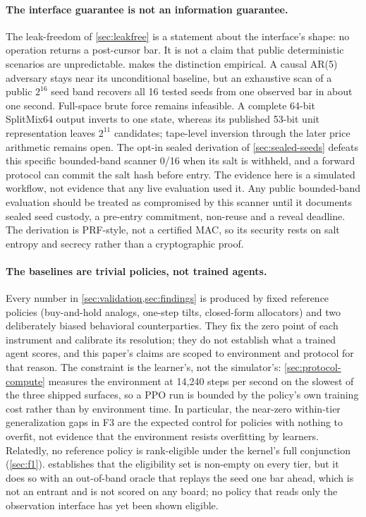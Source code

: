 \paragraph{The interface guarantee is not an information guarantee.} The leak-freedom of \cref{sec:leakfree} is a statement about the interface's shape: no operation returns a post-cursor bar. It is not a claim that public deterministic scenarios are unpredictable.  makes the distinction empirical. A causal AR(5) adversary stays near its unconditional baseline, but an exhaustive scan of a public $2^{16}$ seed band recovers all 16 tested seeds from one observed bar in about one second. Full-space brute force remains infeasible. A complete 64-bit SplitMix64 output inverts to one state, whereas its published 53-bit unit representation leaves $2^{11}$ candidates; tape-level inversion through the later price arithmetic remains open. The opt-in sealed derivation of \cref{sec:sealed-seeds} defeats this specific bounded-band scanner 0/16 when its salt is withheld, and a forward protocol can commit the salt hash before entry. The evidence here is a simulated workflow, not evidence that any live evaluation used it. Any public bounded-band evaluation should be treated as compromised by this scanner until it documents sealed seed custody, a pre-entry commitment, non-reuse and a reveal deadline. The derivation is PRF-style, not a certified MAC, so its security rests on salt entropy and secrecy rather than a cryptographic proof.

\paragraph{The baselines are trivial policies, not trained agents.} Every number in \cref{sec:validation,sec:findings} is produced by fixed reference policies (buy-and-hold analogs, one-step tilts, closed-form allocators) and two deliberately biased behavioral counterparties. They fix the zero point of each instrument and calibrate its resolution; they do not establish what a trained agent scores, and this paper's claims are scoped to environment and protocol for that reason. The constraint is the learner's, not the simulator's: \cref{sec:protocol-compute} measures the environment at 14{,}240 steps per second on the slowest of the three shipped surfaces, so a PPO run is bounded by the policy's own training cost rather than by environment time. In particular, the near-zero within-tier generalization gaps in F3 are the expected control for policies with nothing to overfit, not evidence that the environment resists overfitting by learners. Relatedly, no reference policy is rank-eligible under the kernel's full conjunction (\cref{sec:f1}).  establishes that the eligibility set is non-empty on every tier, but it does so with an out-of-band oracle that replays the seed one bar ahead, which is not an entrant and is not scored on any board; no policy that reads only the observation interface has yet been shown eligible.

